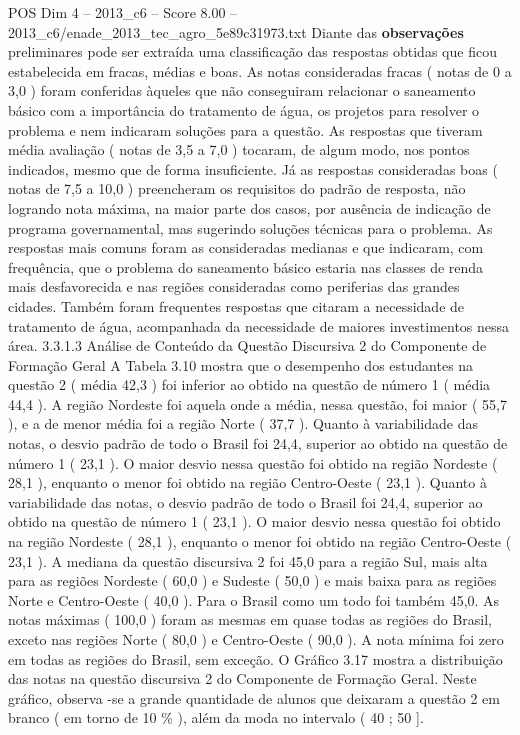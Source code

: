 \begin{textsample}{POS Dim 4 – 2013\_c6 – Score 8.00 – 2013\_c6/enade\_2013\_tec\_agro\_5e89c31973.txt}
Diante das \textbf{observações} preliminares pode ser extraída uma classificação das respostas obtidas que ficou estabelecida em fracas, médias e boas.
As notas consideradas fracas ( notas de 0 a 3,0 ) foram conferidas àqueles que não conseguiram relacionar o saneamento básico com a importância do tratamento de água, os projetos para resolver o problema e nem indicaram soluções para a questão.
As respostas que tiveram média avaliação ( notas de 3,5 a 7,0 ) tocaram, de algum modo, nos pontos indicados, mesmo que de forma insuficiente.
Já as respostas consideradas boas ( notas de 7,5 a 10,0 ) preencheram os requisitos do padrão de resposta, não logrando nota máxima, na maior parte dos casos, por ausência de indicação de programa governamental, mas sugerindo soluções técnicas para o problema.
As respostas mais comuns foram as consideradas medianas e que indicaram, com frequência, que o problema do saneamento básico estaria nas classes de renda mais desfavorecida e nas regiões consideradas como periferias das grandes cidades.
Também foram frequentes respostas que citaram a necessidade de tratamento de água, acompanhada da necessidade de maiores investimentos nessa área. 3.3.1.3 Análise de Conteúdo da Questão Discursiva 2 do Componente de Formação Geral A Tabela 3.10 mostra que o desempenho dos estudantes na questão 2 ( média 42,3 ) foi inferior ao obtido na questão de número 1 ( média 44,4 ).
A região Nordeste foi aquela onde a média, nessa questão, foi maior ( 55,7 ), e a de menor média foi a região Norte ( 37,7 ).
Quanto à variabilidade das notas, o desvio padrão de todo o Brasil foi 24,4, superior ao obtido na questão de número 1 ( 23,1 ).
O maior desvio nessa questão foi obtido na região Nordeste ( 28,1 ), enquanto o menor foi obtido na região Centro-Oeste ( 23,1 ).
Quanto à variabilidade das notas, o desvio padrão de todo o Brasil foi 24,4, superior ao obtido na questão de número 1 ( 23,1 ).
O maior desvio nessa questão foi obtido na região Nordeste ( 28,1 ), enquanto o menor foi obtido na região Centro-Oeste ( 23,1 ).
A mediana da questão discursiva 2 foi 45,0 para a região Sul, mais alta para as regiões Nordeste ( 60,0 ) e Sudeste ( 50,0 ) e mais baixa para as regiões Norte e Centro-Oeste ( 40,0 ).
Para o Brasil como um todo foi também 45,0.
As notas máximas ( 100,0 ) foram as mesmas em quase todas as regiões do Brasil, exceto nas regiões Norte ( 80,0 ) e Centro-Oeste ( 90,0 ).
A nota mínima foi zero em todas as regiões do Brasil, sem exceção.
O Gráfico 3.17 mostra a distribuição das notas na questão discursiva 2 do Componente de Formação Geral.
Neste gráfico, observa -se a grande quantidade de alunos que deixaram a questão 2 em branco ( em torno de 10 \% ), além da moda no intervalo ( 40 ; 50 ].

\end{textsample}
